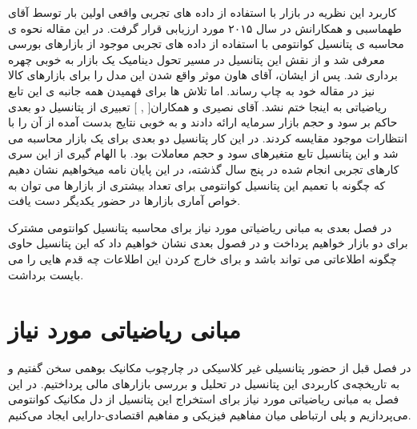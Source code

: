 \documentclass[a4paper,titlepage,12pt,fleqn,oneside]{report}
\begin{document}
  کاربرد این نظریه در بازار با استفاده از داده های تجربی واقعی اولین بار توسط آقای طهماسبی و همکارانش\cite{tahmaseb} در سال ۲۰۱۵ مورد ارزیابی قرار گرفت. در این مقاله نحوه ی محاسبه ی پتانسیل کوانتومی با استفاده از داده های تجربی موجود از بازارهای بورسی معرفی شد و از نقش این پتانسیل در مسیر تحول دینامیک یک بازار به خوبی چهره برداری شد. پس از ایشان، آقای هاون موثر واقع شدن این مدل را برای بازارهای کالا نیز در مقاله خود به چاپ رساند\cite{shen}. اما تلاش ها برای فهمیدن همه جانبه ی این تابع ریاضیاتی به اینجا ختم نشد. آقای نصیری و همکاران[ , ] تعبیری از پتانسیل دو بعدی حاکم بر سود و حجم بازار سرمایه ارائه دادند و به خوبی نتایج بدست آمده از آن را با انتظارات موجود مقایسه کردند. در این کار پتانسیل دو بعدی برای یک بازار محاسبه می شد و این پتانسیل تابع متغیرهای سود و حجم معاملات بود. با الهام گیری از این سری کارهای تجربی انجام شده در پنج سال گذشته، در این پایان نامه میخواهیم نشان دهیم که چگونه با تعمیم این پتانسیل کوانتومی برای تعداد بیشتری از بازارها می توان به خواص آماری بازارها در حضور یکدیگر دست یافت. 
  
  در فصل بعدی به مبانی ریاضیاتی مورد نیاز برای محاسبه پتانسیل کوانتومی مشترک برای دو بازار خواهیم پرداخت و در فصول بعدی نشان خواهیم داد که این پتانسیل حاوی چگونه اطلاعاتی می تواند باشد و برای خارج کردن این اطلاعات چه قدم هایی را می بایست برداشت. 
  
  


\chapter{مبانی ریاضیاتی مورد نیاز}
در فصل قبل از حضور پتانسیلی غیر کلاسیکی در چارچوب مکانیک بوهمی سخن گفتیم و به تاریخچه‌ی کاربردی این پتانسیل در تحلیل و بررسی بازارهای مالی پرداختیم. در این فصل به مبانی ریاضیاتی مورد نیاز برای استخراج این پتانسیل از دل مکانیک کوانتومی می‌پردازیم و پلی ارتباطی میان مفاهیم فیزیکی و مفاهیم اقتصادی-دارایی ایجاد می‌کنیم. 
 
\end{document}
